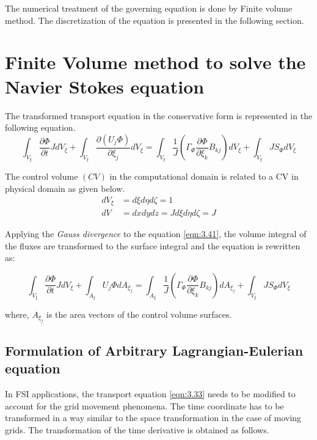 The numerical treatment of the governing equation is done by Finite volume method. The discretization of the equation is presented in the following section.

\section{Finite Volume method to solve the Navier Stokes equation}

The transformed transport equation in the conservative form is represented in the following equation. 
\begin{equation}
\int_{V_{\xi}} \frac{\partial \Phi}{\partial t}J dV_{\xi} + \int_{V_{\xi}} \frac{\partial \left(U_j \Phi\right)}{\partial \xi_j} dV_{\xi} = \int_{V_{\xi}} \frac{1}{J} \left(\Gamma_{\Phi} \frac{\partial \Phi}{\partial \xi_k} B_{kj} \right) dV_{\xi} + \int_{V_{\xi}} JS_{\Phi} dV_{\xi}
\label{eqn:3.41}
\end{equation}

The control volume $\left(CV\right)$ in the computational domain is related to a CV in physical domain as given below.
\begin{align}
dV_{\xi} &= d \xi d \eta d \zeta = 1\\
dV &= dx dy dz = J d \xi d \eta d \zeta = J
\label{eqn:3.43}
\end{align}

Applying the \textit{Gauss divergence} to the equation \ref{eqn:3.41}, the volume integral of the fluxes are transformed to the surface integral and the equation is rewritten as: 

\begin{equation}
\int_{V_{\xi}} \frac{\partial \Phi}{\partial t}J dV_{\xi} + \int_{A_{\xi}} U_j \Phi dA_{{\xi}_j} = \int_{A_{\xi}} \frac{1}{J} \left(\Gamma_{\Phi} \frac{\partial \Phi}{\partial \xi_k} B_{kj} \right) dA_{{\xi}_j} + \int_{V_{\xi}} JS_{\Phi} dV_{\xi}
\label{eqn:3.44}
\end{equation}

where, $A_{{\xi}_j}$ is the area vectors of the control volume surfaces. 

\subsection{Formulation of Arbitrary Lagrangian-Eulerian equation}
In FSI applications, the transport equation \ref{eqn:3.33} needs to be modified to account for the grid movement phenomena. The time coordinate has to be transformed in a way similar to the space transformation in the case of moving grids. The transformation of the time derivative is obtained as follows.

